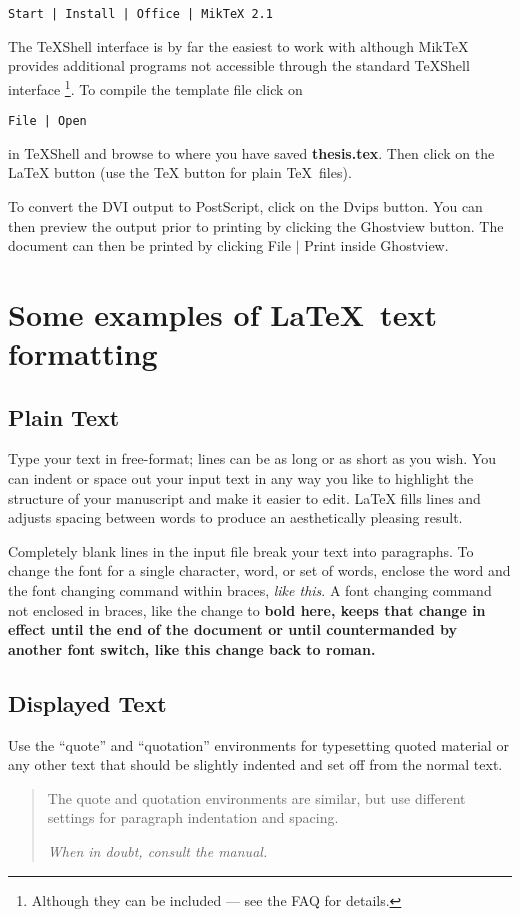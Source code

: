 \documentclass[11pt,oneside]{book}
\begin{document}
\begin{verbatim}
Start | Install | Office | MikTeX 2.1
\end{verbatim}

The TeXShell interface is by far the easiest to work with although
MikTeX provides additional programs not accessible through
the standard TeXShell interface
\footnote
{Although they can be included --- see the FAQ for details.}.
To compile the template file click on
\begin{verbatim}
File | Open
\end{verbatim}
in TeXShell and browse to where you have saved {\bf thesis.tex}.
Then click on the LaTeX button (use the TeX button for plain \TeX \ files).

To convert the DVI output
to PostScript, click on the Dvips button. You can then
preview the output prior to printing by clicking the
Ghostview button. The document can then be printed
by clicking File $|$ Print inside Ghostview.

\section{Some examples of \LaTeX \ text formatting}

\subsection {Plain Text}
Type your text in free-format; lines can be as long
or as short
as you wish.
        You can indent         or space out
        your input
            text in
                any way you like to highlight the structure
        of your manuscript and make it easier to edit.
LaTeX fills lines and adjusts spacing between words to produce an
aesthetically pleasing result.

Completely blank lines in the input file break your text into
paragraphs.
To change the font for a single character, word, or set of words,
enclose the word and the font changing command within braces,
{\em like this}.
A font changing command not enclosed in braces, like the change to \bf
bold here, keeps that change in effect until the end of the document or
until countermanded by another font switch, like this change back to
\rm roman.

\subsection {Displayed Text}
Use the ``quote'' and  ``quotation'' environments for typesetting quoted
material or any other text that should be slightly indented and set off
from the normal text.
\begin{quotation}
The quote and quotation environments are similar, but use different
settings for paragraph indentation and spacing.

\em When in doubt, consult the manual.
\end{quotation}
\end{document}
